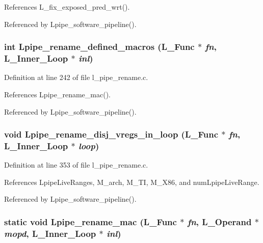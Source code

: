 References L\_\-fix\_\-exposed\_\-pred\_\-wrt().

Referenced by Lpipe\_\-software\_\-pipeline().
\subsubsection{\setlength{\rightskip}{0pt plus 5cm}int Lpipe\_\-rename\_\-defined\_\-macros (L\_\-Func $\ast$ {\em fn}, L\_\-Inner\_\-Loop $\ast$ {\em inl})}\label{l__pipe__rename_8c_f87757396ae9cd301b0f54e3871e342a}




Definition at line 242 of file l\_\-pipe\_\-rename.c.

References Lpipe\_\-rename\_\-mac().

Referenced by Lpipe\_\-software\_\-pipeline().
\subsubsection{\setlength{\rightskip}{0pt plus 5cm}void Lpipe\_\-rename\_\-disj\_\-vregs\_\-in\_\-loop (L\_\-Func $\ast$ {\em fn}, L\_\-Inner\_\-Loop $\ast$ {\em loop})}\label{l__pipe__rename_8c_c5fcbc92b251c0f8652e1aef2f1ea203}




Definition at line 353 of file l\_\-pipe\_\-rename.c.

References Lpipe\-Live\-Ranges, M\_\-arch, M\_\-TI, M\_\-X86, and num\-Lpipe\-Live\-Range.

Referenced by Lpipe\_\-software\_\-pipeline().
\subsubsection{\setlength{\rightskip}{0pt plus 5cm}static void Lpipe\_\-rename\_\-mac (L\_\-Func $\ast$ {\em fn}, L\_\-Operand $\ast$ {\em mopd}, L\_\-Inner\_\-Loop $\ast$ {\em inl})\hspace{0.3cm}{\tt  [static]}}\label{l__pipe__rename_8c_fb7141767cb6ee389d450b56f31cc41c}




